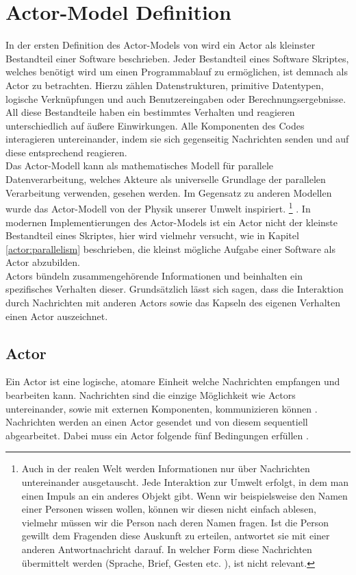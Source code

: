 \section{Actor-Model Definition}\label{actor:definition}
In der ersten Definition des Actor-Models von \citep{hewitt1973session} wird ein Actor als kleinster Bestandteil einer Software beschrieben. Jeder Bestandteil eines Software Skriptes, welches benötigt wird um einen Programmablauf zu ermöglichen, ist demnach als Actor zu betrachten. Hierzu zählen Datenstrukturen, primitive Datentypen, logische Verknüpfungen und auch Benutzereingaben oder Berechnungsergebnisse. All diese Bestandteile haben ein bestimmtes Verhalten und reagieren unterschiedlich auf äußere Einwirkungen. Alle Komponenten des Codes interagieren untereinander, indem sie sich gegenseitig Nachrichten senden und auf diese entsprechend reagieren.\\
Das Actor-Modell kann als mathematisches Modell für parallele Datenverarbeitung, welches Akteure als universelle Grundlage der parallelen Verarbeitung verwenden, gesehen werden. Im Gegensatz zu anderen Modellen wurde das Actor-Modell von der Physik unserer Umwelt inspiriert. \footnote{Auch in der realen Welt werden Informationen nur über Nachrichten untereinander ausgetauscht. Jede Interaktion zur Umwelt erfolgt, in dem man einen Impuls an ein anderes Objekt gibt. Wenn wir beispielsweise den Namen einer Personen wissen wollen, können wir diesen nicht einfach ablesen, vielmehr müssen wir die Person nach deren Namen fragen. Ist die Person gewillt dem Fragenden diese Auskunft zu erteilen, antwortet sie mit einer anderen Antwortnachricht darauf. In welcher Form diese Nachrichten übermittelt werden (Sprache, Brief, Gesten etc. ), ist nicht relevant.} \citep{Vernon2015ReactiveAkka} . In modernen Implementierungen des Actor-Models ist ein Actor nicht der kleinste Bestandteil eines Skriptes, hier wird vielmehr versucht, wie in Kapitel \ref{actor:parallelism} beschrieben, die kleinst mögliche Aufgabe einer Software als Actor abzubilden. \\
Actors bündeln zusammengehörende Informationen und beinhalten ein spezifisches Verhalten dieser. Grundsätzlich lässt sich sagen, dass die Interaktion durch Nachrichten mit anderen Actors sowie das Kapseln des eigenen Verhalten einen Actor auszeichnet.

\subsection{Actor}
Ein Actor ist eine logische, atomare Einheit welche Nachrichten empfangen und bearbeiten kann. Nachrichten sind die einzige Möglichkeit wie Actors untereinander, sowie mit externen Komponenten, kommunizieren können \citep{Agha1985ConcurrentParallelism}. Nachrichten werden an einen Actor gesendet und von diesem sequentiell abgearbeitet. Dabei muss ein Actor folgende fünf Bedingungen erfüllen \citep{Agha1985ConcurrentParallelism}.

